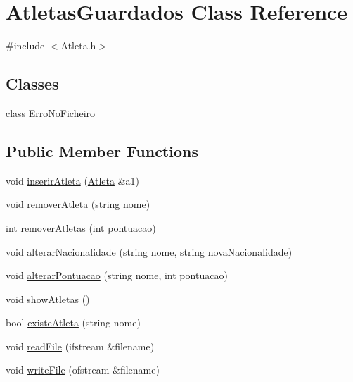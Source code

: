 \hypertarget{class_atletas_guardados}{}\section{Atletas\+Guardados Class Reference}
\label{class_atletas_guardados}


{\ttfamily \#include $<$Atleta.\+h$>$}

\subsection*{Classes}
\begin{DoxyCompactItemize}
\item 
class \hyperlink{class_atletas_guardados_1_1_erro_no_ficheiro}{Erro\+No\+Ficheiro}
\end{DoxyCompactItemize}
\subsection*{Public Member Functions}
\begin{DoxyCompactItemize}
\item 
void \hyperlink{class_atletas_guardados_aaa2e7a60be16032953537e8f01ff79ef}{inserir\+Atleta} (\hyperlink{class_atleta}{Atleta} \&a1)
\item 
void \hyperlink{class_atletas_guardados_a915cfb991d3bf0ce7373e41a106d92e7}{remover\+Atleta} (string nome)
\item 
int \hyperlink{class_atletas_guardados_a621182c76eb4ee89fa077d7a0f6e9301}{remover\+Atletas} (int pontuacao)
\item 
void \hyperlink{class_atletas_guardados_a01382143f590f05fd346d61db72d088c}{alterar\+Nacionalidade} (string nome, string nova\+Nacionalidade)
\item 
void \hyperlink{class_atletas_guardados_a90bd5cfd620631d55de216bdbd1bc32d}{alterar\+Pontuacao} (string nome, int pontuacao)
\item 
void \hyperlink{class_atletas_guardados_a52332d05adf3c1dec061928e298d4dab}{show\+Atletas} ()
\item 
bool \hyperlink{class_atletas_guardados_a336fd41643b6f9c20cc9765269e07024}{existe\+Atleta} (string nome)
\item 
void \hyperlink{class_atletas_guardados_a41a384d044daf9a355d282f34cd92fac}{read\+File} (ifstream \&filename)
\item 
void \hyperlink{class_atletas_guardados_a9c4ab740c5b3502d6cea35504ffdae53}{write\+File} (ofstream \&filename)
\end{DoxyCompactItemize}
